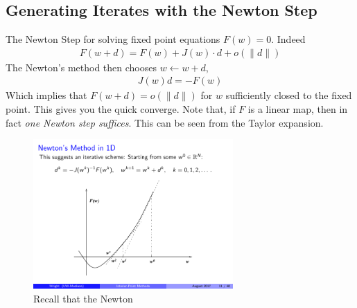 \subsection{Generating Iterates with the Newton Step}
	The Newton Step for solving fixed point equations $F(w) = 0$. Indeed
	\begin{eqnarray}
	F(w+d) = F(w) + J(w)\cdot d + o(\|d\|)
	\end{eqnarray}
	The Newton's method then chooses $w \leftarrow w + d$,
	\begin{eqnarray}
	J(w)d = - F(w)
	\end{eqnarray}
	Which implies that $F(w+d) = o(\|d\|)$ for $w$ sufficiently closed to the fixed point. This gives you the quick converge. Note that, if $F$ is a linear map, then in fact \emph{one Newton step suffices}. This can be seen from the Taylor expansion. 

\begin{figure}
\begin{center}
\includegraphics[width=3in]{figures/lecture26-newton}
\end{center}
\caption{ Recall that the Newton}
\end{figure}


